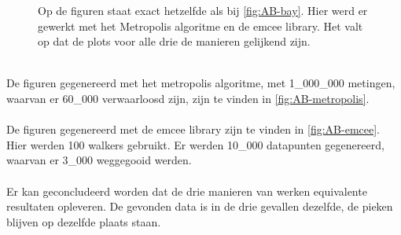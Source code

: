 \begin{figure}
\begin{minipage}{0.98\linewidth}
        \label{fig:AB-emcee}
    \end{minipage}
    \caption{Op de figuren staat exact hetzelfde als bij \cref{fig:AB-bay}. Hier werd er gewerkt met het Metropolis algoritme en de emcee library.  Het valt op dat de plots voor alle drie de manieren gelijkend zijn.}
    \label{fig:AB-met-mc}
\end{figure}\mbox{}\\
De figuren gegenereerd met het metropolis algoritme, met 1\_000\_000 metingen, waarvan er 60\_000 verwaarloosd zijn, zijn te vinden in \cref{fig:AB-metropolis}. \\ \\
De figuren gegenereerd met de emcee library zijn te vinden in \cref{fig:AB-emcee}. Hier werden 100 walkers gebruikt. Er werden 10\_000 datapunten gegenereerd, waarvan er 3\_000 weggegooid werden.
\\ \\
Er kan geconcludeerd worden dat de drie manieren van werken equivalente resultaten opleveren. De gevonden data is in de drie gevallen dezelfde, de pieken blijven op dezelfde plaats staan.
